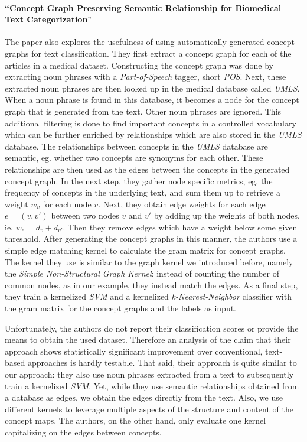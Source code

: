 \paragraph{``Concept Graph Preserving Semantic Relationship for Biomedical Text Categorization" \cite{Gulrandhe2015}}
The paper also explores the usefulness of using automatically generated concept graphs for text classification.
They first extract a concept graph for each of the articles in a medical dataset. Constructing the concept graph was done by extracting noun phrases with a \textit{Part-of-Speech} tagger, short \textit{POS}.
Next, these extracted noun phrases are then looked up in the medical database called \textit{UMLS}. When a noun phrase is found in this database, it becomes a node for the concept graph that is generated from the text. Other noun phrases are ignored.
This additional filtering is done to find important concepts in a controlled vocabulary which can be further enriched by relationships which are also stored in the \textit{UMLS} database.
The relationships between concepts in the \textit{UMLS} database are semantic, eg. whether two concepts are synonyms for each other.
These relationships are then used as the edges between the concepts in the generated concept graph.
In the next step, they gather node specific metrics, eg. the frequency of concepts in the underlying text, and sum them up to retrieve a weight $w_v$ for each node $v$.
Next, they obtain edge weights for each edge $e = (v, v')$ between two nodes $v$ and $v'$ by adding up the weights of both nodes, ie. $w_e = d_v + d_{v'}$.
Then they remove edges which have a weight below some given threshold.
After generating the concept graphs in this manner, the authors use a simple edge matching kernel to calculate the gram matrix for concept graphs.
The kernel they use is similar to the graph kernel we introduced before, namely the \textit{Simple Non-Structural Graph Kernel}: instead of counting the number of common nodes, as in our example, they instead match the edges.
As a final step, they train a kernelized \textit{SVM} and a kernelized \textit{k-Nearest-Neighbor} classifier with the gram matrix for the concept graphs and the labels as input.

Unfortunately, the authors do not report their classification scores or provide the means to obtain the used dataset. 
Therefore an analysis of the claim that their approach shows statistically significant improvement over conventional, text-based approaches is hardly testable.
That said, their approach is quite similar to our approach: they also use noun phrases extracted from a text to subsequently train a kernelized \textit{SVM}.
Yet, while they use semantic relationships obtained from a database as edges, we obtain the edges directly from the text.
Also, we use different kernels to leverage multiple aspects of the structure and content of the concept maps. The authors, on the other hand, only evaluate one kernel capitalizing on the edges between concepts.

